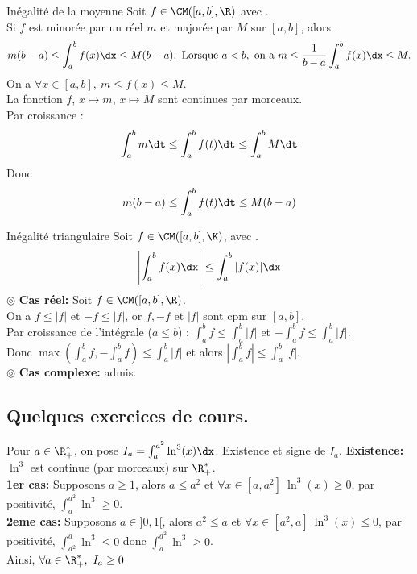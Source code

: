 \documentclass[11pt]{article}
\begin{document}
\begin{prop}{Inégalité de la moyenne}{}
    Soit $f\in\CM([a,b], \R)$ avec .\\
    Si $f$ est minorée par un réel $m$ et majorée par $M$ sur $[a,b]$, alors :
    \begin{equation*}
        m(b-a) \leq \int_a^bf(x)\dx \leq M(b-a),~\text{Lorsque }a<b, \text{ on a } m\leq\frac{1}{b-a}\int_a^bf(x)\dx\leq M.
    \end{equation*}
    \tcblower
    On a $\forall x\in[a,b], ~ m \leq f(x) \leq M$.\\
    La fonction $f$, $x\mapsto m$, $x\mapsto M$ sont continues par morceaux.\\
    Par croissance :
    \begin{equation*}
        \int_a^bm\dt\leq \int_a^bf(t)\dt\leq\int_a^bM\dt
    \end{equation*}
    Donc
    \begin{equation*}
        m(b-a) \leq \int_a^bf(t)\dt\leq M(b-a)
    \end{equation*}
\end{prop}

\begin{prop}{Inégalité triangulaire}{}
    Soit $f\in\CM([a,b], \K)$, avec .
    \begin{equation*}
        \left|\int_a^bf(x)\dx\right|\leq\int_a^b|f(x)|\dx
    \end{equation*}
    \tcblower
    $\circledcirc$ \textbf{Cas réel:} Soit $f\in\CM([a,b], \R)$.\\
    On a $f\leq|f|$ et $-f\leq|f|$, or $f, -f$ et $|f|$ sont cpm sur $[a,b]$.\\
    Par croissance de l'intégrale ($a\leq b$) : $\int_a^b f \leq \int_a^b|f|$ et $-\int_a^bf \leq\int_a^b|f|$.\\
    Donc $\max(\int_a^b f, -\int_a^b f) \leq \int_a^b|f|$ et alors $\left|\int_a^b f\right|\leq\int_a^b|f|$.\\
    $\circledcirc$ \textbf{Cas complexe:} admis.
\end{prop}

\subsection{Quelques exercices de cours.}

\begin{ex}{}{}
    Pour $a\in\R^*_+$, on pose $I_a=\int_a^{a^2}\ln^3(x)\dx$. Existence et signe de $I_a$.
    \tcblower
    \textbf{Existence:} $\ln^3$ est continue (par morceaux) sur $\R^*_+$.\\
    \textbf{1er cas:} Supposons $a\geq1$, alors $a\leq a^2$ et $\forall x \in [a,a^2] ~ \ln^3(x) \geq 0$, par positivité, $\int_a^{a^2}\ln^3\geq0$.\\
    \textbf{2eme cas:} Supposons $a\in]0,1[$, alors $a^2\leq a$ et $\forall x \in [a^2, a] ~ \ln^3(x)\leq0$, par positivité, $\int_{a^2}^a\ln^3\leq0$ donc $\int_a^{a^2}\ln^3\geq0$.\\
    Ainsi, $\forall a\in\R^*_+, ~ I_a\geq0$
\end{ex}
\end{document}
